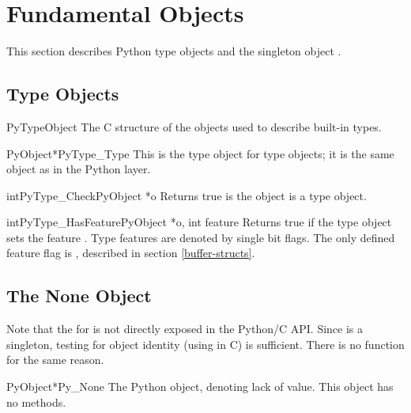 \documentclass{manual}
\begin{document}
\section{Fundamental Objects \label{fundamental}}

This section describes Python type objects and the singleton object 
.


\subsection{Type Objects \label{typeObjects}}

\begin{ctypedesc}{PyTypeObject}
The C structure of the objects used to describe built-in types.
\end{ctypedesc}

\begin{cvardesc}{PyObject*}{PyType_Type}
This is the type object for type objects; it is the same object as
 in the Python layer.
\end{cvardesc}

\begin{cfuncdesc}{int}{PyType_Check}{PyObject *o}
Returns true is the object  is a type object.
\end{cfuncdesc}

\begin{cfuncdesc}{int}{PyType_HasFeature}{PyObject *o, int feature}
Returns true if the type object  sets the feature
.  Type features are denoted by single bit flags.  The
only defined feature flag is , 
described in section \ref{buffer-structs}.
\end{cfuncdesc}


\subsection{The None Object \label{noneObject}}

Note that the  for  is not directly
exposed in the Python/C API.  Since  is a singleton,
testing for object identity (using \samp{==} in C) is sufficient.
There is no  function for the same reason.

\begin{cvardesc}{PyObject*}{Py_None}
The Python  object, denoting lack of value.  This object has
no methods.
\end{cvardesc}
\end{document}
